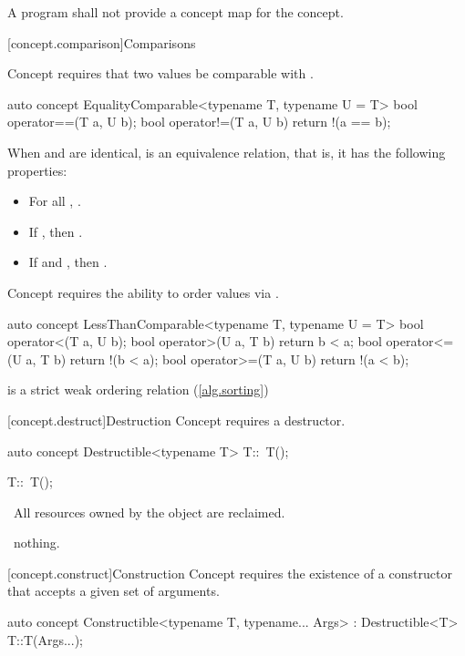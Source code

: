 \documentclass[american,twoside]{book}
\begin{document}
\pnum
A program shall not provide a concept map for the
 concept.

[concept.comparison]{Comparisons}

\pnum
Concept  requires that two values be
comparable with .
\begin{itemdecl}
auto concept EqualityComparable<typename T, typename U = T> {
  bool operator==(T a, U b);
  bool operator!=(T a, U b) { return !(a == b); }
}
\end{itemdecl}

\pnum 
When  and  are identical,  is an
equivalence relation, that is, it has the following properties:
\begin{itemize}
\item
For all , .
\item
If , then .
\item
If  and , then .
\end{itemize}

\pnum Concept  requires the ability to order
values via .
\begin{itemdecl}
auto concept LessThanComparable<typename T, typename U = T> {
  bool operator<(T a, U b);
  bool operator>(U a, T b) { return b < a; }
  bool operator<=(U a, T b) { return !(b < a); }
  bool operator>=(T a, U b) { return !(a < b); }
}
\end{itemdecl}

\pnum
{} is a strict weak ordering relation (\ref{alg.sorting})

[concept.destruct]{Destruction}
\pnum
Concept  requires a destructor.
\begin{itemdecl}
auto concept Destructible<typename T> {
  T::~T();
}
\end{itemdecl}

\begin{itemdecl}
T::~T();
\end{itemdecl}

\begin{itemdescr}
\pnum
\postconditions\
All resources owned by the object are reclaimed.

\pnum
\throws\
nothing.
\end{itemdescr}

[concept.construct]{Construction}
\pnum
Concept  requires the existence of a constructor
that accepts a given set of arguments.
\begin{itemdecl}
auto concept Constructible<typename T, typename... Args> 
  : Destructible<T> 
{
  T::T(Args...);
}
\end{itemdecl}
\end{document}
